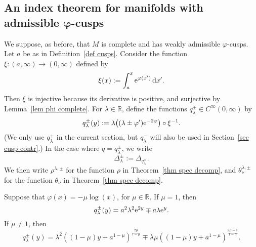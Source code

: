 \documentclass[pdftex]{sigma}%
\numberwithin{equation}{section}
\newcommand{\R}{\mathbb{R}}
\begin{document}
\subsection[An index theorem for manifolds with admissible varphi-cusps]{An index theorem for manifolds with admissible $\boldsymbol{\varphi}$-cusps}

We suppose, as before, that $M$ is complete and has weakly admissible $\varphi$-cusps. Let $a$ be as in Definition~\ref{def cusps}. Consider the function $\xi\colon (a,\infty) \to (0, \infty)$ defined by
\begin{equation} \label{eq def xi}
\xi(x) := \int_{a}^x {\rm e}^{\varphi(x')}\, {\rm d}x'.
\end{equation}
Then $\xi$ is injective because its derivative is positive, and surjective by Lemma~\ref{lem phi complete}. For $\lambda \in \R$, define the functions $q_{\lambda}^{\pm} \in C^{\infty}(0,\infty)$ by
\begin{equation} \label{eq def q lambda}
q_{\lambda}^{\pm}(y) := \lambda \bigl((\lambda \pm \varphi') {\rm e}^{-2\varphi} \bigr)\circ \xi^{-1}.
\end{equation}
(We only use $q_{\lambda}^+$
in the current section, but $q_{\lambda}^-$
will also be used in Section~\ref{sec cusp contr}.)
In the case where $q = q^{\pm}_{\lambda}$, we write
\begin{equation} \label{eq Delta lambda}
 \Delta^{\pm}_{\lambda} := \Delta_{q^{\pm}_{\lambda}}.
\end{equation}
We then write $\rho^{\lambda, \pm}$ for the function $\rho$ in Theorem~\ref{thm spec decomp}, and $\theta_{\nu}^{\lambda, \pm}$ for the function $\theta_{\nu}$ in Theorem~\ref{thm spec decomp}.

\begin{Example}%
Suppose that $\varphi(x) = -\mu\log(x)$, for $\mu \in \R$. If $\mu = 1$, then
\[
q_{\lambda}^{\pm}(y) = a^2 \lambda^2 {\rm e}^{2y} \mp a\lambda {\rm e}^y.
\]
If $\mu \not = 1$, then
\[
q_{\lambda}^{\pm}(y) = \lambda^2 \left( (1-\mu)y+a^{1-\mu} \right)^{\frac{2\mu}{1-\mu}} \mp \lambda \mu \left( (1-\mu)y + a^{1-\mu}\right)^{\frac{2\mu - 1}{1-\mu}}.
\]
\end{Example}
\end{document}
